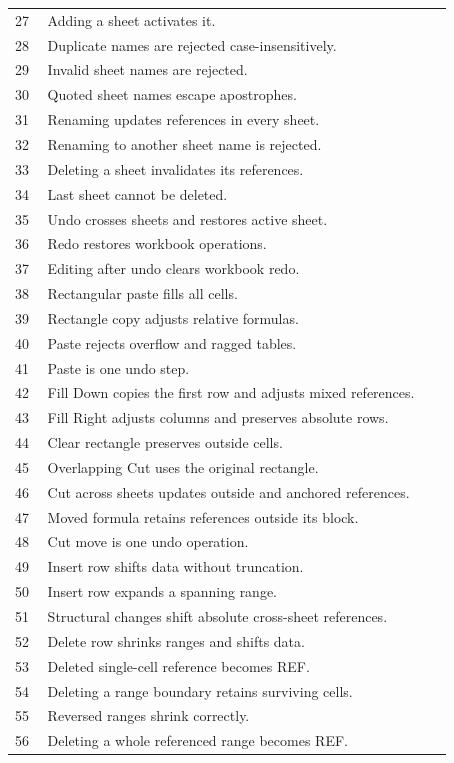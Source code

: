\documentclass[11pt,letterpaper]{article}
\begin{document}
\begin{longtable}{@{}P{0.07\linewidth}P{0.87\linewidth}@{}}
27 & Adding a sheet activates it.\\
28 & Duplicate names are rejected case-insensitively.\\
29 & Invalid sheet names are rejected.\\
30 & Quoted sheet names escape apostrophes.\\
31 & Renaming updates references in every sheet.\\
32 & Renaming to another sheet name is rejected.\\
33 & Deleting a sheet invalidates its references.\\
34 & Last sheet cannot be deleted.\\
35 & Undo crosses sheets and restores active sheet.\\
36 & Redo restores workbook operations.\\
37 & Editing after undo clears workbook redo.\\
38 & Rectangular paste fills all cells.\\
39 & Rectangle copy adjusts relative formulas.\\
40 & Paste rejects overflow and ragged tables.\\
41 & Paste is one undo step.\\
42 & Fill Down copies the first row and adjusts mixed references.\\
43 & Fill Right adjusts columns and preserves absolute rows.\\
44 & Clear rectangle preserves outside cells.\\
45 & Overlapping Cut uses the original rectangle.\\
46 & Cut across sheets updates outside and anchored references.\\
47 & Moved formula retains references outside its block.\\
48 & Cut move is one undo operation.\\
49 & Insert row shifts data without truncation.\\
50 & Insert row expands a spanning range.\\
51 & Structural changes shift absolute cross-sheet references.\\
52 & Delete row shrinks ranges and shifts data.\\
53 & Deleted single-cell reference becomes REF.\\
54 & Deleting a range boundary retains surviving cells.\\
55 & Reversed ranges shrink correctly.\\
56 & Deleting a whole referenced range becomes REF.\\

\end{longtable}
\end{document}
